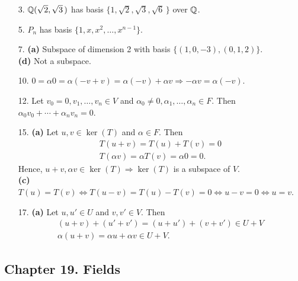 {\small
\begin{itemize}
 
\bf\item[3.]\rm 
${\Bbb Q}(\sqrt{2}, \sqrt{3}\, )$ has basis $\{ 1, \sqrt{2}, \sqrt{3},
\sqrt{6}\, \}$  over ${\Bbb Q}$.
 
\bf\item[5.]\rm
$P_n$ has basis $\{ 1, x, x^2, \ldots, x^{n-1} \}$.
 
\bf\item[7.]\rm
{\bf (a)} Subspace of dimension 2 with basis $\{(1, 0, -3), (0, 1,
2) \}$.\\
{\bf (d)} Not a subspace.
 
\bf\item[10.]\rm
$0 =  \alpha 0 = \alpha(-v+v) = \alpha(-v) + \alpha v \Rightarrow 
-\alpha v = \alpha(-v)$.
 
\bf\item[12.]\rm
Let $v_0 = 0, v_1, \ldots, v_n \in V$ and $\alpha_0 \neq 0, \alpha_1,
\ldots, \alpha_n \in F$. Then $\alpha_0 v_0 + \cdots + \alpha_n v_n =
0$.
 
\bf\item[15.]\rm
{\bf (a)}
Let $u, v \in \ker(T)$ and $\alpha \in F$.  Then
\[
\begin{array}{c}
T(u +v) = T(u) + T(v) = 0 \\
T(\alpha v) = \alpha T(v) = \alpha 0 = 0.
\end{array}
\]
Hence, $u + v, \alpha v \in \ker(T) \Rightarrow \ker(T)$ is 
a subspace of
$V$. \\
{\bf (c)} 
$T(u) = T(v) \Leftrightarrow T(u-v) = T(u) - T(v) = 0
\Leftrightarrow u-v = 0 \Leftrightarrow u = v$.
 
 
\bf\item[17.]\rm
{\bf (a)}
Let $u, u' \in U$ and $v, v' \in V$. Then
\[
\begin{array}{c}
(u + v) + (u' + v') = (u + u') + (v + v') \in U + V \\
\alpha(u + v) = \alpha u + \alpha v \in U + V.
\end{array}
\]
 
\end{itemize}
}
 
\subsection*{Chapter 19. Fields}
 
